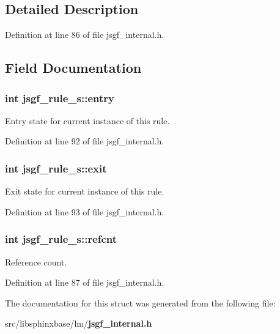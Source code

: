 \subsection{\-Detailed \-Description}


\-Definition at line 86 of file jsgf\-\_\-internal.\-h.



\subsection{\-Field \-Documentation}
\subsubsection[{entry}]{\setlength{\rightskip}{0pt plus 5cm}int {\bf jsgf\-\_\-rule\-\_\-s\-::entry}}\label{structjsgf__rule__s_a0d54a847059e9690854a9776cb5051e4}


\-Entry state for current instance of this rule. 



\-Definition at line 92 of file jsgf\-\_\-internal.\-h.

\subsubsection[{exit}]{\setlength{\rightskip}{0pt plus 5cm}int {\bf jsgf\-\_\-rule\-\_\-s\-::exit}}\label{structjsgf__rule__s_a9bdd64ed40fe86c14a2f0bf01252b069}


\-Exit state for current instance of this rule. 



\-Definition at line 93 of file jsgf\-\_\-internal.\-h.

\subsubsection[{refcnt}]{\setlength{\rightskip}{0pt plus 5cm}int {\bf jsgf\-\_\-rule\-\_\-s\-::refcnt}}\label{structjsgf__rule__s_aeb4c05f6daa425a37d362e2c6de1228e}


\-Reference count. 



\-Definition at line 87 of file jsgf\-\_\-internal.\-h.



\-The documentation for this struct was generated from the following file\-:\begin{DoxyCompactItemize}
\item 
src/libsphinxbase/lm/{\bf jsgf\-\_\-internal.\-h}\end{DoxyCompactItemize}
